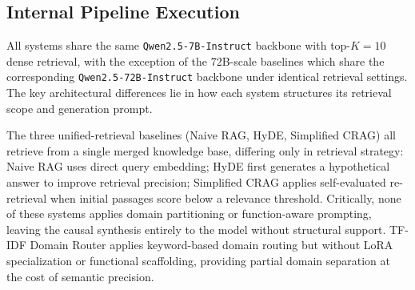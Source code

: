 \documentclass[a4paper,fleql,doubleblind]{cas-sc}
\begin{document}
\subsection{Internal Pipeline Execution}
\label{ssec:pipeline}
All systems share the same \texttt{Qwen2.5-7B-Instruct} backbone with
top-$K{=}10$ dense retrieval, with the exception of the 72B-scale baselines
which share the corresponding \texttt{Qwen2.5-72B-Instruct} backbone under
identical retrieval settings. The key architectural differences lie in how
each system structures its retrieval scope and generation prompt.

The three unified-retrieval baselines (Naive RAG, HyDE, Simplified CRAG) all retrieve
from a single merged knowledge base, differing only in retrieval strategy:
Naive RAG uses direct query embedding; HyDE first generates a hypothetical
answer to improve retrieval precision; Simplified CRAG applies self-evaluated re-retrieval
when initial passages score below a relevance threshold. Critically, none of
these systems applies domain partitioning or function-aware prompting,
leaving the causal synthesis entirely to the model without structural support.
TF-IDF Domain Router applies keyword-based domain routing but without LoRA
specialization or functional scaffolding, providing partial domain separation
at the cost of semantic precision.
\end{document}
